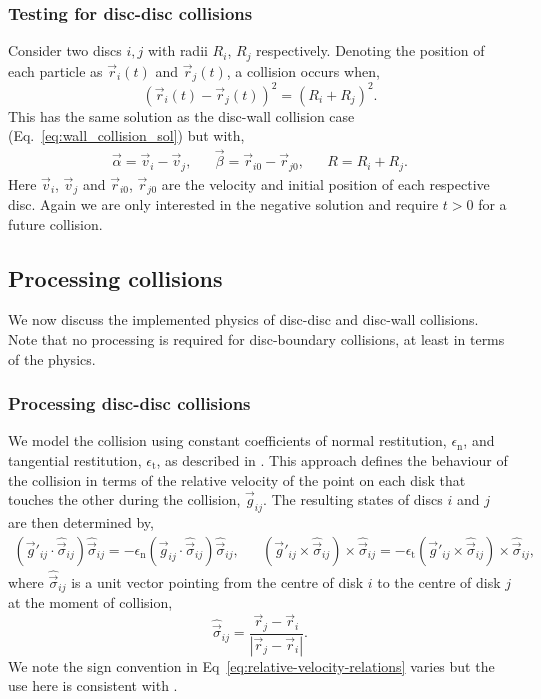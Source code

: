 \documentclass{article}
\begin{document}
\subsubsection{Testing for disc-disc collisions}
Consider two discs $i, j$ with radii $R_i$, $R_j$ respectively. Denoting the position of each particle as $\vec{r}_i(t)$ and $\vec{r}_j(t)$, a collision occurs when,
\begin{equation}
    (\vec{r}_i(t) - \vec{r}_j(t))^2 = (R_i + R_j)^2.
\end{equation}
This has the same solution as the disc-wall collision case (Eq.~\ref{eq:wall_collision_sol}) but with,
\begin{align}
    \vec{\alpha}
    =
    \vec{v}_i - \vec{v}_j,
    &&
    \vec{\beta}
    =
    \vec{r}_{i0} - \vec{r}_{j0},
    &&
    R = R_i + R_j.
\end{align}
Here $\vec{v}_i$, $\vec{v}_j$ and $\vec{r}_{i0}$, $\vec{r}_{j0}$ are the velocity and initial position of each respective disc. Again we are only interested in the negative solution and require $t>0$ for a future collision.

\subsection{Processing collisions}
We now discuss the implemented physics of disc-disc and disc-wall collisions. Note that no processing is required for disc-boundary collisions, at least in terms of the physics.

\subsubsection{Processing disc-disc collisions}
We model the collision using constant coefficients of normal restitution, $\epsilon_\mathrm{n}$, and tangential restitution, $\epsilon_\mathrm{t}$, as described in \cite{Kremer-2014}. This approach defines the behaviour of the collision in terms of the relative velocity of the point on each disk that touches the other during the collision, $\vec{g}_{ij}$. The resulting states of discs $i$ and $j$ are then determined by,
\begin{align}
\label{eq:relative-velocity-relations}
    \left( \vec{g}'_{ij} \cdot \hat{\vec{\sigma}}_{ij} \right) \hat{\vec{\sigma}}_{ij}
    =
    - \epsilon_\mathrm{n} \left( \vec{g}_{ij} \cdot \hat{\vec{\sigma}}_{ij} \right) \hat{\vec{\sigma}}_{ij},
    &&
    \left( \vec{g}'_{ij} \times \hat{\vec{\sigma}}_{ij} \right) \times \hat{\vec{\sigma}}_{ij}
    =
    - \epsilon_\mathrm{t} \left( \vec{g}'_{ij} \times \hat{\vec{\sigma}}_{ij} \right) \times \hat{\vec{\sigma}}_{ij},
\end{align}
where $\hat{\vec{\sigma}}_{ij}$ is a unit vector pointing from the centre of disk $i$ to the centre of disk $j$ at the moment of collision,
\begin{equation}
    \hat{\vec{\sigma}}_{ij} = \frac{\vec{r}_j - \vec{r}_i}{|\vec{r}_j - \vec{r}_i|}.
\end{equation}
We note the sign convention in Eq~\ref{eq:relative-velocity-relations} varies but the use here is consistent with \cite{Kremer-2014}.
\end{document}
